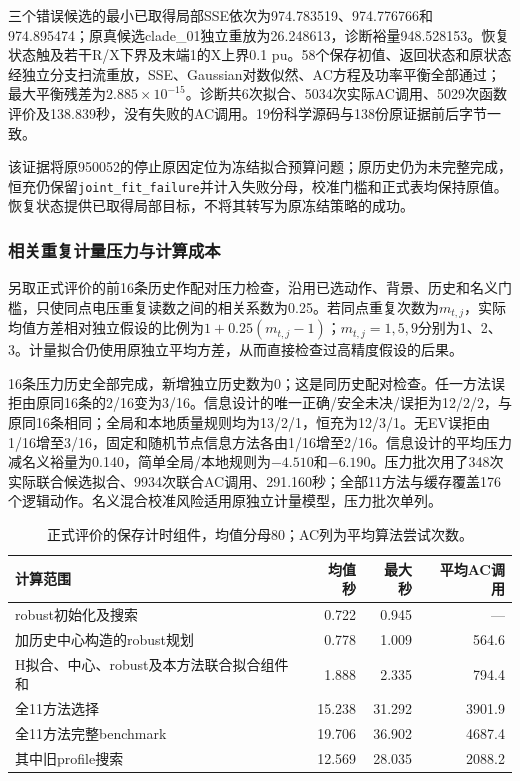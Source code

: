 三个错误候选的最小已取得局部SSE依次为974.783519、974.776766和974.895474；原真候选clade\_01独立重放为26.248613，诊断裕量948.528153。恢复状态触及若干R/X下界及末端1的X上界0.1 pu。58个保存初值、返回状态和原状态经独立分支扫流重放，SSE、Gaussian对数似然、AC方程及功率平衡全部通过；最大平衡残差为$2.885\times10^{-15}$。诊断共6次拟合、5034次实际AC调用、5029次函数评价及138.839秒，没有失败的AC调用。19份科学源码与138份原证据前后字节一致。

该证据将原950052的停止原因定位为冻结拟合预算问题；原历史仍为未完整完成，恒充仍保留\texttt{joint\_fit\_failure}并计入失败分母，校准门槛和正式表均保持原值。恢复状态提供已取得局部目标，不将其转写为原冻结策略的成功。

\subsubsection{相关重复计量压力与计算成本}
另取正式评价的前16条历史作配对压力检查，沿用已选动作、背景、历史和名义门槛，只使同点电压重复读数之间的相关系数为0.25。若同点重复次数为$m_{t,j}$，实际均值方差相对独立假设的比例为$1+0.25(m_{t,j}-1)$；$m_{t,j}=1,5,9$分别为1、2、3。计量拟合仍使用原独立平均方差，从而直接检查过高精度假设的后果。

16条压力历史全部完成，新增独立历史数为0；这是同历史配对检查。任一方法误拒由原同16条的2/16变为3/16。信息设计的唯一正确/安全未决/误拒为12/2/2，与原同16条相同；全局和本地质量规则均为13/2/1，恒充为12/3/1。无EV误拒由1/16增至3/16，固定和随机节点信息方法各由1/16增至2/16。信息设计的平均压力减名义裕量为0.140，简单全局/本地规则为$-4.510$和$-6.190$。压力批次用了348次实际联合候选拟合、9934次联合AC调用、291.160秒；全部11方法与缓存覆盖176个逻辑动作。名义混合校准风险适用原独立计量模型，压力批次单列。

{\small
\begin{longtable}{L{.48\textwidth}rrr}
\caption{正式评价的保存计时组件，均值分母80；AC列为平均算法尝试次数。}\label{tab:information-cost-v3}\\
\toprule
计算范围 & 均值秒 & 最大秒 & 平均AC调用\\
\midrule\endhead
robust初始化及搜索 &0.722&0.945&---\\
加历史中心构造的robust规划 &0.778&1.009&564.6\\
H拟合、中心、robust及本方法联合拟合组件和 &1.888&2.335&794.4\\
全11方法选择 &15.238&31.292&3901.9\\
全11方法完整benchmark &19.706&36.902&4687.4\\
其中旧profile搜索 &12.569&28.035&2088.2\\
\bottomrule
\end{longtable}}

